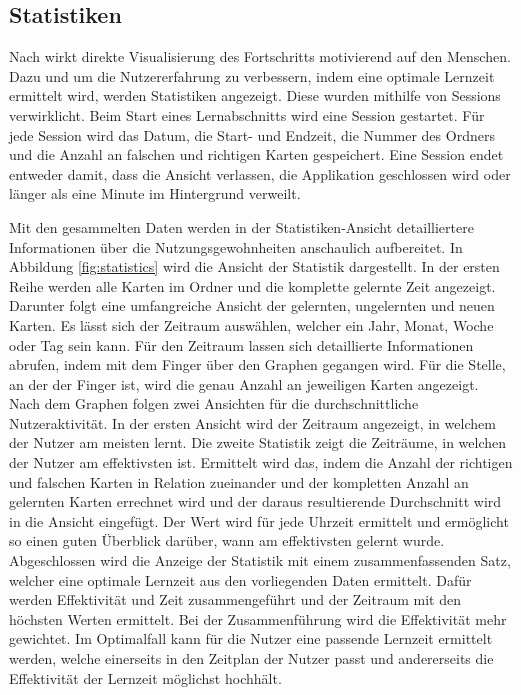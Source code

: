 \subsection{Statistiken}
Nach \cite{AtomicHabits} wirkt direkte Visualisierung des Fortschritts motivierend auf den Menschen. Dazu und um die Nutzererfahrung zu verbessern, indem eine optimale Lernzeit ermittelt wird, werden Statistiken angezeigt. Diese wurden mithilfe von Sessions verwirklicht. Beim Start eines Lernabschnitts wird eine Session gestartet. Für jede Session wird das Datum, die Start- und Endzeit, die Nummer des Ordners und die Anzahl an falschen und richtigen Karten gespeichert. Eine Session endet entweder damit, dass die Ansicht verlassen, die Applikation geschlossen wird oder länger als eine Minute im Hintergrund verweilt.

Mit den gesammelten Daten werden in der Statistiken-Ansicht detailliertere Informationen über die Nutzungsgewohnheiten anschaulich aufbereitet. In Abbildung \ref{fig:statistics} wird die Ansicht der Statistik dargestellt. In der ersten Reihe werden alle Karten im Ordner und die komplette gelernte Zeit angezeigt. Darunter folgt eine umfangreiche Ansicht der gelernten, ungelernten und neuen Karten. Es lässt sich der Zeitraum auswählen, welcher ein Jahr, Monat, Woche oder Tag sein kann. Für den Zeitraum lassen sich detaillierte Informationen abrufen, indem mit dem Finger über den Graphen gegangen wird. Für die Stelle, an der der Finger ist, wird die genau Anzahl an jeweiligen Karten angezeigt. Nach dem Graphen folgen zwei Ansichten für die durchschnittliche Nutzeraktivität. In der ersten Ansicht wird der Zeitraum angezeigt, in welchem der Nutzer am meisten lernt. Die zweite Statistik zeigt die Zeiträume, in welchen der Nutzer am effektivsten ist. Ermittelt wird das, indem die Anzahl der richtigen und falschen Karten in Relation zueinander und der kompletten Anzahl an gelernten Karten errechnet wird und der daraus resultierende Durchschnitt wird in die Ansicht eingefügt. Der Wert wird für jede Uhrzeit ermittelt und ermöglicht so einen guten Überblick darüber, wann am effektivsten gelernt wurde. Abgeschlossen wird die Anzeige der Statistik mit einem zusammenfassenden Satz, welcher eine optimale Lernzeit aus den vorliegenden Daten ermittelt. Dafür werden Effektivität und Zeit zusammengeführt und der Zeitraum mit den höchsten Werten ermittelt. Bei der Zusammenführung wird die Effektivität mehr gewichtet. Im Optimalfall kann für die Nutzer eine passende Lernzeit ermittelt werden, welche einerseits in den Zeitplan der Nutzer passt und andererseits die Effektivität der Lernzeit möglichst hochhält.

